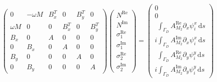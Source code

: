 \documentclass[11pt,a4paper]{article}
\begin{document}
\begin{equation}
\begin{pmatrix}
0 & -\omega M & B_x^T & 0 & B_y^T & 0\\
\omega M & 0 & 0 & B_x^T & 0 & B_y^T\\
B_x & 0 & A & 0 & 0 & 0\\
0 & B_x & 0 & A & 0 & 0\\
B_y & 0 & 0 & 0 & A & 0\\
0 & B_y & 0 & 0 & 0 & A
\end{pmatrix}
\begin{pmatrix}
N^\mathrm{Re}\\
N^\mathrm{Im}\\
\sigma_1^\mathrm{Re}\\
\sigma_1^\mathrm{Im}\\
\sigma_2^\mathrm{Re}\\
\sigma_2^\mathrm{Im}
\end{pmatrix}
=
\begin{pmatrix}
0\\
0\\
\phantom{i}\int_{\Gamma_D}A^\mathrm{Re}_{M_2}\partial_x\psi^x_i\,\mathrm{d}s\\
i\int_{\Gamma_D}A^\mathrm{Im}_{M_2}\partial_x\psi^x_i\,\mathrm{d}s\\
\phantom{i}\int_{\Gamma_D}A^\mathrm{Re}_{M_2}\partial_y\psi^y_i\,\mathrm{d}s\\
i\int_{\Gamma_D}A^\mathrm{Im}_{M_2}\partial_y\psi^y_i\,\mathrm{d}s
\end{pmatrix}
\end{equation}
\end{document}
